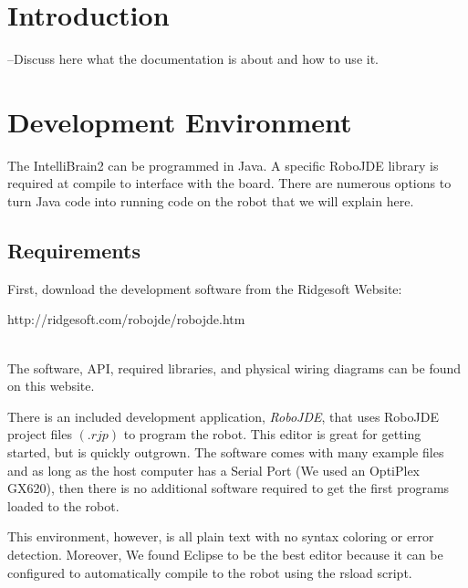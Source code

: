 \documentclass[12pt]{article}
\begin{document}
 


\onehalfspacing

\setcounter{page}{1}
\setlength{\headheight}{15pt} \pagestyle{fancyplain}
\rhead{\fancyplain{}{\small{\textit{\leftmark}}}}\cfoot{\small{\thepage}}
\section{Introduction}
--Discuss here what the documentation is about and how to use it.

\clearpage
\section{Development Environment}
The IntelliBrain2 can be programmed in Java.  A specific RoboJDE library is required at compile to interface with the board.  There are numerous options to turn Java code into running code on the robot that we will explain here.
\subsection{Requirements}
First, download the development software from the Ridgesoft Website:\\
{\color{blue}\centerline{http://ridgesoft.com/robojde/robojde.htm}}\\
The software, API, required libraries, and physical wiring diagrams can be found on this website.

There is an included development application, \textit{RoboJDE}, that uses RoboJDE project files $(.rjp)$ to program the robot.  This editor is great for getting started, but is quickly outgrown.  The software comes with many example files and as long as the host computer has a Serial Port (We used an OptiPlex GX620), then there is no additional software required to get the first programs loaded to the robot.

This environment, however, is all plain text with no syntax coloring or error detection.  Moreover, We found Eclipse to be the best editor because it can be configured to automatically compile to the robot using the rsload script.
\end{document}
